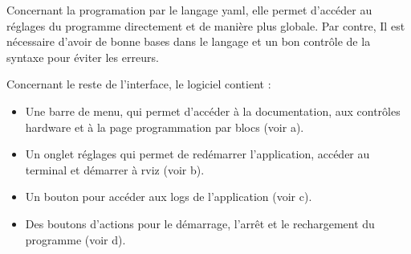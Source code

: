 Concernant la programation par le langage \gls{yaml}, elle permet d'accéder au réglages du programme directement et de manière plus globale. Par contre, Il est nécessaire d'avoir de bonne bases dans le langage et un bon contrôle de la syntaxe pour éviter les erreurs.

Concernant le reste de l'interface, le logiciel contient :

\begin{itemize}
    \item Une barre de menu, qui permet d'accéder à la documentation, aux contrôles \gls{hardware} et à la page programmation par blocs (voir a).
    \item Un onglet réglages qui permet de redémarrer l'application, accéder au terminal et démarrer à \gls{rviz} (voir b).
    \item Un bouton pour accéder aux \gls{logs} de l'application (voir c).
    \item Des boutons d'actions pour le démarrage, l'arrêt et le rechargement du programme (voir d).
\end{itemize}

